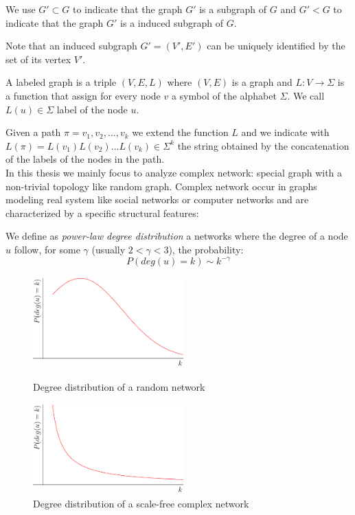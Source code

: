 We use $G' \subset G$ to indicate that the graph $G'$ is a subgraph of $G$ and $G' < G$ to indicate that the graph $G'$ is a induced subgraph of $G$.

Note that an induced subgraph $G' = (V', E')$ can be uniquely identified by the set of its vertex $V'$.\\

\begin{definizione}\label{def:labeledgraph}
	A labeled graph is a triple $(V,E,L)$ where $(V,E)$ is a graph and $L : V \rightarrow \Sigma$
	is a function that assign for every node $v$ a symbol of the alphabet $\Sigma$. We call $L(u) \in \Sigma$ label of the node $u$.
\end{definizione}

Given a path $\pi = v_{1}, v_{2}, \ldots, v_{k}$ we extend the function $L$ and we indicate with $L(\pi) = L(v_{1}) L(v_{2}) \ldots L(v_{k}) \in \Sigma^{k}$ the string obtained by the concatenation of the labels of the nodes in the path.\\

In this thesis we mainly focus to analyze complex network: special graph with a non-trivial topology like random graph. Complex network occur in graphs modeling real system like social networks or computer networks and are characterized by a specific structural features:

\begin{definizione}\label{def:power-law-graph}
	We define as \textit{power-law degree distribution} a networks where the degree of a node $u$ follow, for some $\gamma$ (usually $2 < \gamma < 3$), the probability:
	\begin{equation}
		P(deg(u) = k) \sim k^{-\gamma}  
	\end{equation}
\end{definizione}

\begin{figure}[h]
	\centering
	\begin{minipage}[t]{.45\textwidth}
		\centering
		\includegraphics[width=5.8cm,height=3.5cm]{figure/figure-1-1} %
		\caption{Degree distribution of a random network}
	\end{minipage}\hfill
	\begin{minipage}[t]{.45\textwidth}
		\centering 
		\includegraphics[width=5.8cm,height=3.5cm]{figure/figure-1-2} %
		\caption{Degree distribution of a scale-free complex network}
	\end{minipage}
\end{figure}


